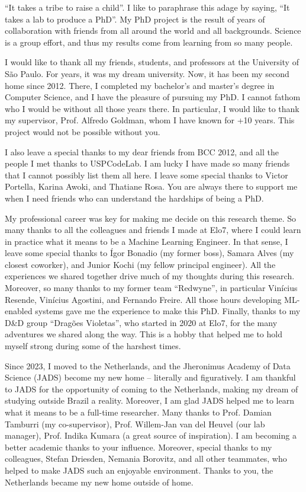 \documentclass[12pt,twoside,brazilian,english]{book}
\begin{document}

``It takes a tribe to raise a child''. I like to paraphrase this adage by
saying, ``It takes a lab to produce a PhD''. My PhD project is the result
of years of collaboration with friends from all around the world and all
backgrounds. Science is a group effort, and thus my results come from
learning from so many people.

I would like to thank all my friends, students, and professors at the
University of São Paulo. For years, it was my dream university. Now,
it has been my second home since 2012. There, I completed my bachelor's
and master's degree in Computer Science, and I have the pleasure of
pursuing my PhD. I cannot fathom who I would be without all those
years there. In particular, I would like to thank my supervisor,
Prof. Alfredo Goldman, whom I have known for +10 years.
This project would not be possible without you.

I also leave a special thanks to my dear friends from BCC 2012,
and all the people I met thanks to USPCodeLab. I am lucky I have
made so many friends that I cannot possibly list them all here.
I leave some special thanks to Victor Portella, Karina Awoki, and
Thatiane Rosa. You are always there to support me when I need
friends who can understand the hardships of being a PhD.

My professional career was key for making me decide on this research
theme. So many thanks to all the colleagues and friends I made at Elo7,
where I could learn in practice what it means to be a Machine Learning
Engineer. In that sense, I leave some special thanks to Ígor Bonadio
(my former boss), Samara Alves (my closest coworker), and Junior Kochi
(my fellow principal engineer). All the experiences we shared together
drive much of my thoughts during this research. Moreover, so many thanks
to my former team ``Redwyne'', in particular Vinícius Resende, Vinícius
Agostini, and Fernando Freire. All those hours developing ML-enabled
systems gave me the experience to make this PhD. Finally, thanks to my
D\&D group ``Dragões Violetas'', who started in 2020 at Elo7, for the
many adventures we shared along the way. This is a hobby
that helped me to hold myself strong during some of the harshest times.

Since 2023, I moved to the Netherlands, and the Jheronimus Academy of
Data Science (JADS) become my new home -- literally and figuratively.
I am thankful to JADS for the opportunity of coming to the Netherlands,
making my dream of studying outside Brazil a reality. Moreover, I am glad
JADS helped me to learn what it means to be a full-time researcher.
Many thanks to Prof. Damian Tamburri (my co-supervisor), Prof. Willem-Jan
van del Heuvel (our lab manager), Prof. Indika Kumara (a great source of
inspiration). I am becoming a better academic thanks to your influence.
Moreover, special thanks to my colleagues, Stefan Driesden, Nemania Borovitz,
and all other teammates, who helped to make JADS such an enjoyable
environment. Thanks to you, the Netherlands became my new home
outside of home.
\end{document}
